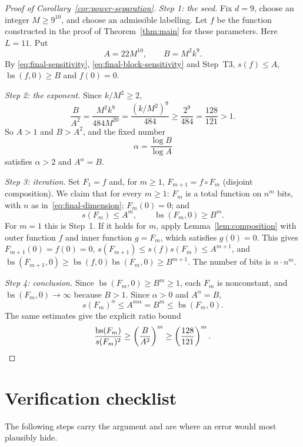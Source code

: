 \documentclass[11pt]{article}
\newcommand{\bs}{\operatorname{bs}}
\theoremstyle{definition}
\theoremstyle{remark}
\begin{document}
\begin{proof}[Proof of Corollary~\ref{cor:power-separation}]
\emph{Step 1: the seed.}
Fix $d=9$, choose an integer $M\geq9^{10}$, and choose an admissible
labelling. Let $f$ be the function constructed in the proof of
Theorem~\ref{thm:main} for these parameters. Here \(L=11\). Put
\[
 A=22M^{10},\qquad B=M^2k^9.
\]
By \eqref{eq:final-sensitivity}, \eqref{eq:final-block-sensitivity} and Step~T3, $s(f)\leq A$, $\bs(f,0)\geq B$ and $f(0)=0$.

\emph{Step 2: the exponent.}
Since \(k/M^2\ge2\),
\[
 \frac{B}{A^2}
   =\frac{M^2k^9}{484M^{20}}
   =\frac{(k/M^2)^9}{484}
   \geq\frac{2^9}{484}
   =\frac{128}{121}>1.
\]
So $A>1$ and $B>A^2$, and the fixed number
\[
 \alpha=\frac{\log B}{\log A}
\]
satisfies \(\alpha>2\) and \(A^\alpha=B\).

\emph{Step 3: iteration.}
Set $F_1=f$ and, for $m\geq1$, $F_{m+1}=f\circ F_m$ (disjoint composition).
We claim that for every \(m\ge1\): $F_m$ is a total function on $n^m$ bits, with $n$ as in~\eqref{eq:final-dimension}; \(F_m(0)=0\); and
\[
 s(F_m)\leq A^m,
 \qquad
 \bs(F_m,0)\geq B^m.
\]
For \(m=1\) this is Step~1. If it holds for \(m\), apply Lemma~\ref{lem:composition} with outer function \(f\) and inner function \(g=F_m\), which satisfies \(g(0)=0\). This gives \(F_{m+1}(0)=f(0)=0\), \(s(F_{m+1})\le s(f)s(F_m)\le A^{m+1}\), and \(\bs(F_{m+1},0)\ge\bs(f,0)\bs(F_m,0)\ge B^{m+1}\). The number of bits is \(n\cdot n^m\).

\emph{Step 4: conclusion.}
Since \(\bs(F_m,0)\ge B^m\ge1\), each \(F_m\) is nonconstant, and \(\bs(F_m,0)\to\infty\) because \(B>1\). Since \(\alpha>0\) and $A^\alpha=B$,
\[
 s(F_m)^\alpha\leq A^{m\alpha}=B^m\leq\bs(F_m,0).
\]
The same estimates give the explicit ratio bound
\[
 \frac{\bs(F_m)}{s(F_m)^2}
 \geq\left(\frac{B}{A^2}\right)^m
 \geq\left(\frac{128}{121}\right)^m.\qedhere
\]
\end{proof}

\section{Verification checklist}

The following steps carry the argument and are where an error would most plausibly hide.
\end{document}
